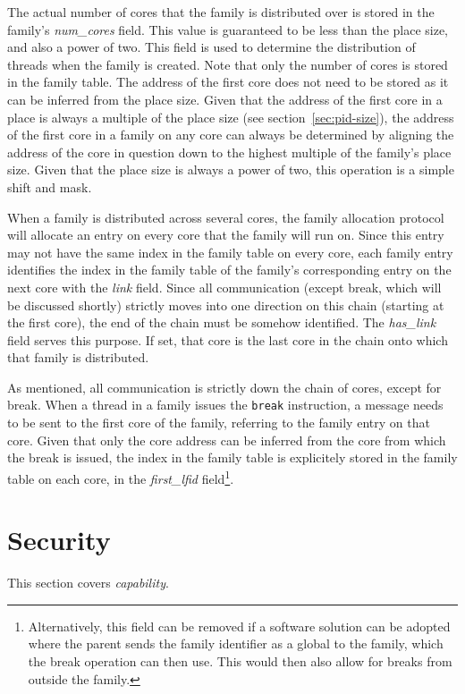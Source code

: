 The actual number of cores that the family is distributed over is stored in the family's \emph{num\_cores} field. This value is guaranteed to be less than the place size, and also a power of two. This field is used to determine the distribution of threads when the family is created. Note that only the number of cores is stored in the family table. The address of the first core does not need to be stored as it can be inferred from the place size. Given that the address of the first core in a place is always a multiple of the place size (see section~\ref{sec:pid-size}), the address of the first core in a family on any core can always be determined by aligning the address of the core in question down to the highest multiple of the family's place size. Given that the place size is always a power of two, this operation is a simple shift and mask.

When a family is distributed across several cores, the family allocation protocol will allocate an entry on every core that the family will run on. Since this entry may not have the same index in the family table on every core, each family entry identifies the index in the family table of the family's corresponding entry on the next core with the \emph{link} field. Since all communication (except break, which will be discussed shortly) strictly moves into one direction on this chain (starting at the first core), the end of the chain must be somehow identified. The \emph{has\_link} field serves this purpose. If set, that core is the last core in the chain onto which that family is distributed.

As mentioned, all communication is strictly down the chain of cores, except for break. When a thread in a family issues the {\tt break} instruction, a message needs to be sent to the first core of the family, referring to the family entry on that core. Given that only the core address can be inferred from the core from which the break is issued, the index in the family table is explicitely stored in the family table on each core, in the \emph{first\_lfid} field\footnote{Alternatively, this field can be removed if a software solution can be adopted where the parent sends the family identifier as a global to the family, which the break operation can then use. This would then also allow for breaks from outside the family.}.

\section{Security}
This section covers \emph{capability}.

